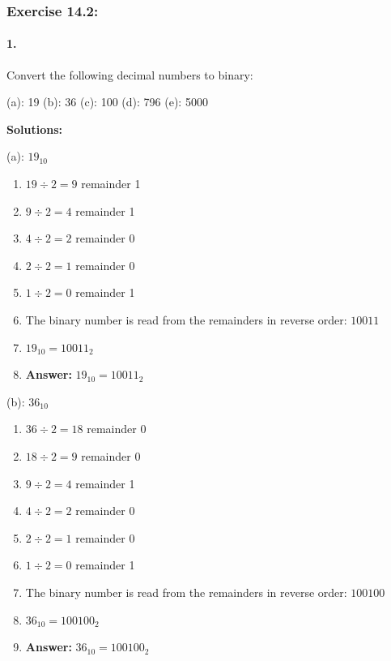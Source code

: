 \documentclass{article}
\begin{document}
\newpage

\subsubsection*{Exercise 14.2:} 
\vspace*{0.25cm}

\paragraph*{1.}
Convert the following decimal numbers to binary:

\vspace*{0.25cm}
(a): 19 (b): 36 (c): 100 (d): 796 (e): 5000

\vspace*{0.5cm}

\noindent \textbf{Solutions:}

\vspace*{0.25cm}

\noindent (a): $19_{10}$

\begin{enumerate}
    \item $19 \div 2 = 9$ remainder 1
    \item $9 \div 2 = 4$ remainder 1
    \item $4 \div 2 = 2$ remainder 0
    \item $2 \div 2 = 1$ remainder 0
    \item $1 \div 2 = 0$ remainder 1
    \item The binary number is read from the remainders in reverse order: $10011$
    \item $19_{10} = 10011_2$
    \item \textbf{Answer:} $19_{10} = 10011_2$
\end{enumerate}

\vspace*{0.5cm}

\noindent (b): $36_{10}$

\begin{enumerate}
    \item $36 \div 2 = 18$ remainder 0
    \item $18 \div 2 = 9$ remainder 0
    \item $9 \div 2 = 4$ remainder 1
    \item $4 \div 2 = 2$ remainder 0
    \item $2 \div 2 = 1$ remainder 0
    \item $1 \div 2 = 0$ remainder 1
    \item The binary number is read from the remainders in reverse order: $100100$
    \item $36_{10} = 100100_2$
    \item \textbf{Answer:} $36_{10} = 100100_2$
\end{enumerate}
\end{document}

